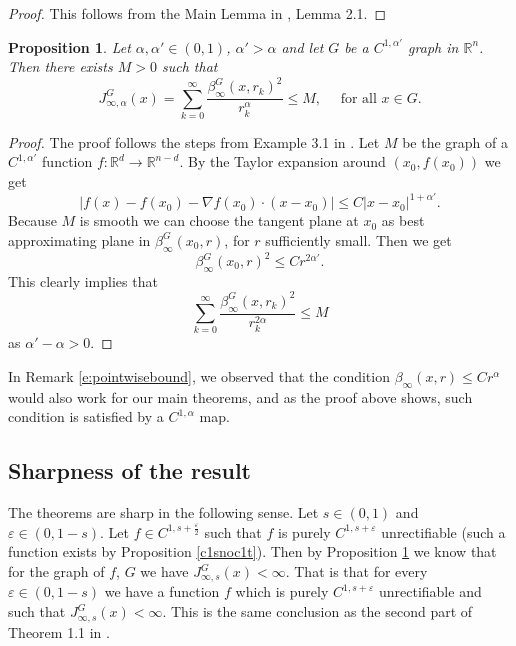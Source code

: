 \documentclass[11pt, twoside, leqno]{article}
\numberwithin{equation}{section}
\theoremstyle{plain}
\newtheorem{prop}[thm]{Proposition}
\theoremstyle{definition}
\newcommand{\R}{\mathbb{R}}
\newcommand{\e}{\varepsilon} %
\begin{document}
\begin{proof}
This follows from the Main Lemma in \cite{tolsaI}, Lemma 2.1. 
\end{proof}

\begin{prop} \label{taylor}
Let $\alpha, \alpha' \in (0,1)$, $\alpha' > \alpha$ and let $G$ be a $C^{1,\alpha'}$ graph in $\R^n$. Then there exists $M >0$ such that
\begin{equation}
    J_{\infty,\alpha}^G(x)=\sum_{k=0}^{\infty}\frac{\beta_{\infty}^G(x,r_k)^2}{r_k^{\alpha}} \leq M, \quad \text{ for all $x \in G$}.
\end{equation}
\end{prop}
\begin{proof}
The proof follows the steps from Example 3.1 in \cite{naber}. Let $M$ be the graph of a $C^{1,\alpha'}$ function $f\colon \R^d \to \R^{n-d}$. By the Taylor expansion around $(x_0,f(x_0))$ we get
\begin{equation}
    |f(x)-f(x_0) - \nabla f(x_0)\cdot (x-x_0)| \leq C |x-x_0|^{1+ \alpha'}.
\end{equation}
Because $M$ is smooth we can choose the tangent plane at $x_0$ as best approximating plane in $\beta_{\infty}^G(x_0,r)$, for $r$ sufficiently small.
Then we get
\begin{equation}
    \beta_{\infty}^G(x_0,r)^2 \leq C r^{2\alpha'}.
\end{equation}
This clearly implies that
\begin{equation}
    \sum_{k=0}^{\infty}\frac{\beta_{\infty}^G(x,r_k)^2}{r_k^{2\alpha}} \leq M
\end{equation}
as $\alpha'-\alpha>0$.
\end{proof}

In Remark \ref{e:pointwisebound}, we observed that the condition $\beta_{\infty}(x,r) \leq C r^{\alpha}$ would also work for our main theorems, and as the proof above shows, such condition is satisfied by a $C^{1,\alpha}$ map. 


\subsection{Sharpness of the result}
The theorems are sharp in the following sense. Let $s \in (0,1)$ and $\e \in (0,1-s)$. Let $f \in C^{1, s + \frac{\e}{2}}$ such that $f$ is purely $C^{1, s + \e}$ unrectifiable (such a function exists by Proposition \ref{c1snoc1t}). Then by Proposition \ref{taylor} we know that for the graph of $f$, $G$ we have $J_{\infty,s}^G(x)< \infty$. That is that for every $\e \in (0,1-s)$ we have a function $f$ which is purely $C^{1, s + \e}$ unrectifiable and such that $J_{\infty,s}^G(x)< \infty$.
This is the same conclusion as the second part of Theorem 1.1 in \cite{kola3}.
\end{document}
